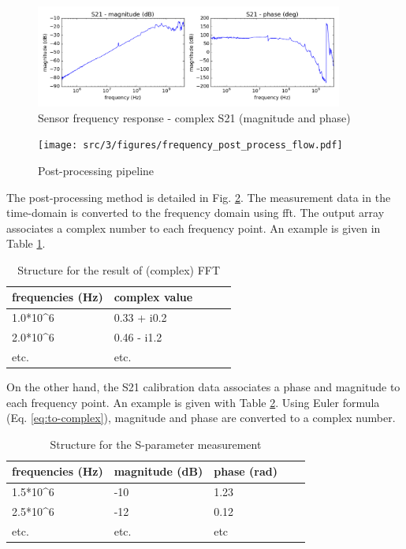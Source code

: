 \begin{figure}[!h]
  \centering
  \includegraphics[width=0.9\textwidth]{src/3/figures/s21_freq_response.png}
  \caption{Sensor frequency response - complex S21 (magnitude and phase)}
  \label{fig:s21-response-complex}
\end{figure}

\begin{figure}[!h]
  \centering
  \texttt{[image: src/3/figures/frequency\_post\_process\_flow.pdf]}
  \caption{Post-processing pipeline}
  \label{fig:postprocess-nfs-pipeline}
\end{figure}

The post-processing method is detailed in Fig. \ref{fig:postprocess-nfs-pipeline}.
The measurement data in the time-domain is converted to the frequency domain using \gls{fft}.
The output array associates a complex number to each frequency point.
An example is given in Table \ref{tab:complex-fft}.

\begin{table}[!h]
  \centering
  \begin{tabular}{@{}lllll@{}}
  \toprule
  frequencies (Hz)        & complex value                \\ \midrule
  1.0*10^6                & 0.33 + i0.2                  \\
  2.0*10^6                & 0.46 - i1.2                  \\
  etc.                    & etc.                         \\ \bottomrule
  \end{tabular}
  \caption{Structure for the result of (complex) FFT}
  \label{tab:complex-fft}
\end{table}

On the other hand, the S21 calibration data associates a phase and magnitude to each frequency point.
An example is given with Table \ref{tab:sparams}.
Using Euler formula (Eq. \ref{eq:to-complex}), magnitude and phase are converted to a complex number.

\begin{table}[!h]
  \centering
  \begin{tabular}{@{}lllll@{}}
  \toprule
  frequencies (Hz)          & magnitude (dB)         & phase (rad)     \\ \midrule
  1.5*10^6                  & -10                    & 1.23            \\
  2.5*10^6                  & -12                    & 0.12            \\
  etc.                      & etc.                   & etc             \\ \bottomrule
  \end{tabular}
  \caption{Structure for the S-parameter measurement}
  \label{tab:sparams}
\end{table}

